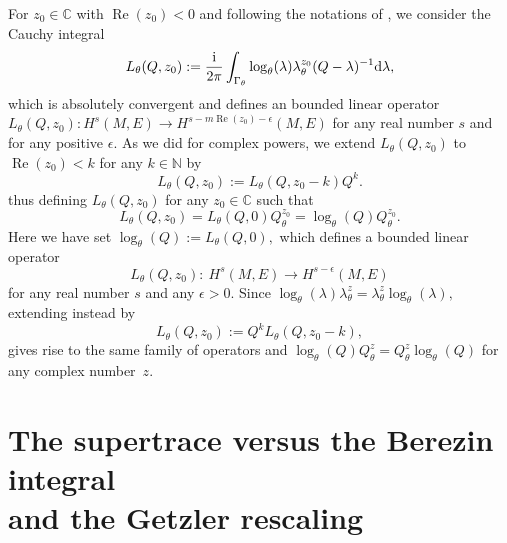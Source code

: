 \documentclass[pdftex]{sigma}
\numberwithin{equation}{section}
\theoremstyle{definition}
\newcommand{\C}{\mathbb C}
\newcommand{\N}{\mathbb N}
\begin{document}
	For $z_0\in \C$ with $\operatorname{Re}(z_0)< 0$ and following the notations of \cite[formula (2.6.1.6)]{Sc}, we consider the Cauchy integral
	\begin{gather*}
		L_\theta(Q, z_0)
		:=\frac{{\rm i}}{2\pi}\int_{\Gamma_{\theta}} \log _\theta(\lambda) \lambda_\theta^{z_0} (Q-\lambda)^{-1} {\rm d}\lambda,
	\end{gather*}
	which is absolutely convergent and defines an bounded linear operator $ L_\theta(Q, z_0)\colon H^s(M,E)\longrightarrow H^{s-m\operatorname{Re}(z_0)-\epsilon}(M,E)$ for any real number $s$ and for any positive $\epsilon$.
	As we did for complex powers, we extend $ L_\theta(Q, z_0)$ to $\operatorname{Re}(z_0)<k$ for any $k\in \N$ by \cite[formula (2.6.1.7)]{Sc}
	\begin{equation*}	%
		L_\theta(Q, z_0):= L_\theta(Q, z_0-k) Q^k. \end{equation*}
	thus defining $L_\theta(Q, z_0)$ for any $z_0\in \C$ such that
	\[L_\theta(Q, z_0)= L_\theta(Q, 0) Q_\theta^{z_0}= \log_\theta(Q) Q_\theta^{z_0}.\]
Here we have set $\log_\theta(Q):= L_\theta(Q, 0),$ which defines a bounded linear operator
\[
L_\theta(Q, z_0)\colon \ H^s(M,E)\to H^{s -\epsilon}(M,E)
\]
 for any real number $s$ and any $\epsilon>0$. Since $\log_\theta(\lambda) \lambda_\theta^z= \lambda_\theta^z \log_\theta (\lambda),$ extending instead by
	\begin{equation*} L_\theta(Q, z_0):= Q^k L_\theta(Q, z_0-k), \end{equation*} gives rise to the same family of operators and $\log _\theta (Q) Q_\theta^z=Q_\theta^z \log _\theta (Q)$ for any complex number~$z$.

\section[The supertrace versus the Berezin integral and the Getzler rescaling]{The supertrace versus the Berezin integral\\ and the Getzler rescaling} \label{sec:appendix3}
\end{document}
